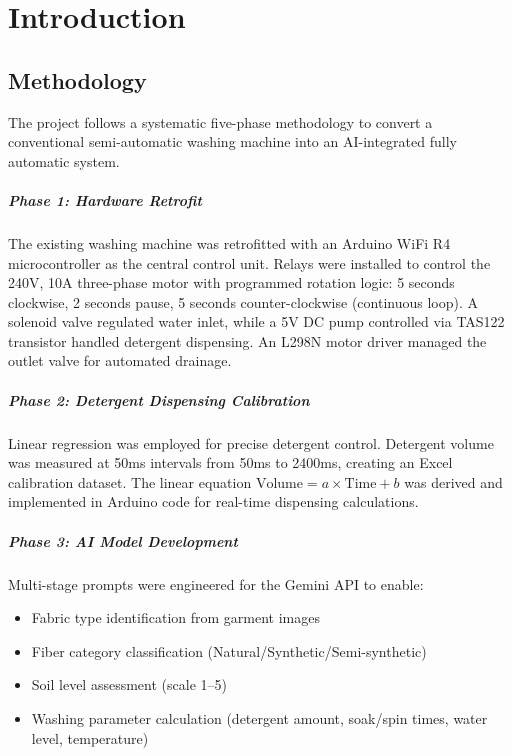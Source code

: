 \chapter{Introduction}

\section{Methodology}
The project follows a systematic five-phase methodology to convert a conventional semi-automatic washing machine into an AI-integrated fully automatic system.

\paragraph{Phase 1: Hardware Retrofit}
The existing washing machine was retrofitted with an Arduino WiFi R4 microcontroller as the central control unit. Relays were installed to control the 240V, 10A three-phase motor with programmed rotation logic: 5 seconds clockwise, 2 seconds pause, 5 seconds counter-clockwise (continuous loop). A solenoid valve regulated water inlet, while a 5V DC pump controlled via TAS122 transistor handled detergent dispensing. An L298N motor driver managed the outlet valve for automated drainage.

\paragraph{Phase 2: Detergent Dispensing Calibration}
Linear regression was employed for precise detergent control. Detergent volume was measured at 50ms intervals from 50ms to 2400ms, creating an Excel calibration dataset. The linear equation \( \text{Volume} = a \times \text{Time} + b \) was derived and implemented in Arduino code for real-time dispensing calculations.

\paragraph{Phase 3: AI Model Development}
Multi-stage prompts were engineered for the Gemini API to enable:
\begin{itemize}
    \item Fabric type identification from garment images
    \item Fiber category classification (Natural/Synthetic/Semi-synthetic)
    \item Soil level assessment (scale 1–5)
    \item Washing parameter calculation (detergent amount, soak/spin times, water level, temperature)
\end{itemize}

